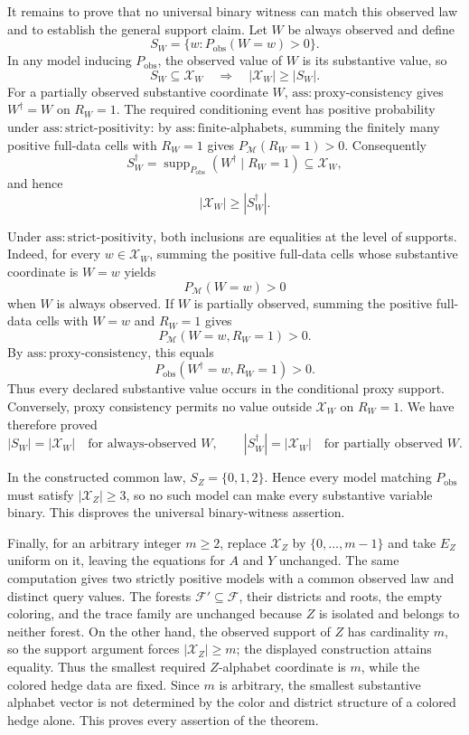 It remains to prove that no universal binary witness can match this observed law and to establish the general support claim. Let \(W\) be always observed and define
\[
 S_W=\{w:P_{\mathrm{obs}}(W=w)>0\}.
\]
In any model inducing \(P_{\mathrm{obs}}\), the observed value of \(W\) is its substantive value, so
\[
 S_W\subseteq\mathcal X_W
 \quad\Longrightarrow\quad
 |\mathcal X_W|\geq |S_W|.
\]
For a partially observed substantive coordinate \(W\), \(\mathrm{ass{:}proxy\text{-}consistency}\) gives \(W^{\dagger}=W\) on \(R_W=1\). The required conditioning event has positive probability under \(\mathrm{ass{:}strict\text{-}positivity}\): by \(\mathrm{ass{:}finite\text{-}alphabets}\), summing the finitely many positive full-data cells with \(R_W=1\) gives \(P_{\mathcal M}(R_W=1)>0\). Consequently
\[
 S_W^{\dagger}
 =\operatorname{supp}_{P_{\mathrm{obs}}}(W^{\dagger}\mid R_W=1)
 \subseteq\mathcal X_W,
\]
and hence
\[
 |\mathcal X_W|\geq |S_W^{\dagger}|.
\]

Under \(\mathrm{ass{:}strict\text{-}positivity}\), both inclusions are equalities at the level of supports. Indeed, for every \(w\in\mathcal X_W\), summing the positive full-data cells whose substantive coordinate is \(W=w\) yields
\[
 P_{\mathcal M}(W=w)>0
\]
when \(W\) is always observed. If \(W\) is partially observed, summing the positive full-data cells with \(W=w\) and \(R_W=1\) gives
\[
 P_{\mathcal M}(W=w,R_W=1)>0.
\]
By \(\mathrm{ass{:}proxy\text{-}consistency}\), this equals
\[
 P_{\mathrm{obs}}(W^{\dagger}=w,R_W=1)>0.
\]
Thus every declared substantive value occurs in the conditional proxy support. Conversely, proxy consistency permits no value outside \(\mathcal X_W\) on \(R_W=1\). We have therefore proved
\[
 |S_W|=|\mathcal X_W|
 \quad\text{for always-observed }W,
 \qquad
 |S_W^{\dagger}|=|\mathcal X_W|
 \quad\text{for partially observed }W.
\]

In the constructed common law, \(S_Z=\{0,1,2\}\). Hence every model matching \(P_{\mathrm{obs}}\) must satisfy \(|\mathcal X_Z|\geq3\), so no such model can make every substantive variable binary. This disproves the universal binary-witness assertion.

Finally, for an arbitrary integer \(m\geq2\), replace \(\mathcal X_Z\) by \(\{0,\ldots,m-1\}\) and take \(E_Z\) uniform on it, leaving the equations for \(A\) and \(Y\) unchanged. The same computation gives two strictly positive models with a common observed law and distinct query values. The forests \(\mathcal F'\subseteq\mathcal F\), their districts and roots, the empty coloring, and the trace family are unchanged because \(Z\) is isolated and belongs to neither forest. On the other hand, the observed support of \(Z\) has cardinality \(m\), so the support argument forces \(|\mathcal X_Z|\geq m\); the displayed construction attains equality. Thus the smallest required \(Z\)-alphabet coordinate is \(m\), while the colored hedge data are fixed. Since \(m\) is arbitrary, the smallest substantive alphabet vector is not determined by the color and district structure of a colored hedge alone. This proves every assertion of the theorem.